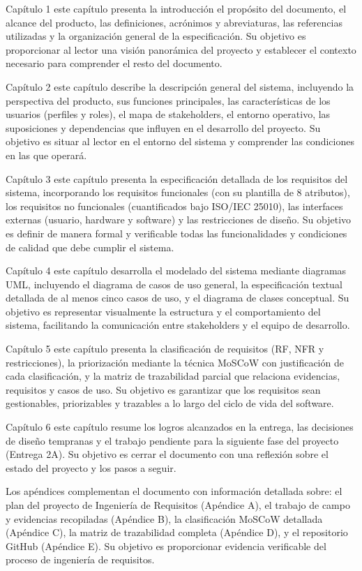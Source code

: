 \documentclass[11pt,a4paper]{article}
\begin{document}
Capítulo 1 este capítulo presenta la introducción el propósito del documento, el alcance del producto, las definiciones, acrónimos y abreviaturas, las referencias utilizadas y la organización general de la especificación. Su objetivo es proporcionar al lector una visión panorámica del proyecto y establecer el contexto necesario para comprender el resto del documento.

Capítulo 2 este capítulo describe la descripción general del sistema, incluyendo la perspectiva del producto, sus funciones principales, las características de los usuarios (perfiles y roles), el mapa de stakeholders, el entorno operativo, las suposiciones y dependencias que influyen en el desarrollo del proyecto. Su objetivo es situar al lector en el entorno del sistema y comprender las condiciones en las que operará.

Capítulo 3 este capítulo presenta la especificación detallada de los requisitos del sistema, incorporando los requisitos funcionales (con su plantilla de 8 atributos), los requisitos no funcionales (cuantificados bajo ISO/IEC 25010), las interfaces externas (usuario, hardware y software) y las restricciones de diseño. Su objetivo es definir de manera formal y verificable todas las funcionalidades y condiciones de calidad que debe cumplir el sistema.

Capítulo 4 este capítulo desarrolla el modelado del sistema mediante diagramas UML, incluyendo el diagrama de casos de uso general, la especificación textual detallada de al menos cinco casos de uso, y el diagrama de clases conceptual. Su objetivo es representar visualmente la estructura y el comportamiento del sistema, facilitando la comunicación entre stakeholders y el equipo de desarrollo.

Capítulo 5 este capítulo presenta la clasificación de requisitos (RF, NFR y restricciones), la priorización mediante la técnica MoSCoW con justificación de cada clasificación, y la matriz de trazabilidad parcial que relaciona evidencias, requisitos y casos de uso. Su objetivo es garantizar que los requisitos sean gestionables, priorizables y trazables a lo largo del ciclo de vida del software.

Capítulo 6 este capítulo resume los logros alcanzados en la entrega, las decisiones de diseño tempranas y el trabajo pendiente para la siguiente fase del proyecto (Entrega 2A). Su objetivo es cerrar el documento con una reflexión sobre el estado del proyecto y los pasos a seguir.

Los apéndices complementan el documento con información detallada sobre: el plan del proyecto de Ingeniería de Requisitos (Apéndice A), el trabajo de campo y evidencias recopiladas (Apéndice B), la clasificación MoSCoW detallada (Apéndice C), la matriz de trazabilidad completa (Apéndice D), y el repositorio GitHub (Apéndice E). Su objetivo es proporcionar evidencia verificable del proceso de ingeniería de requisitos.
\end{document}
